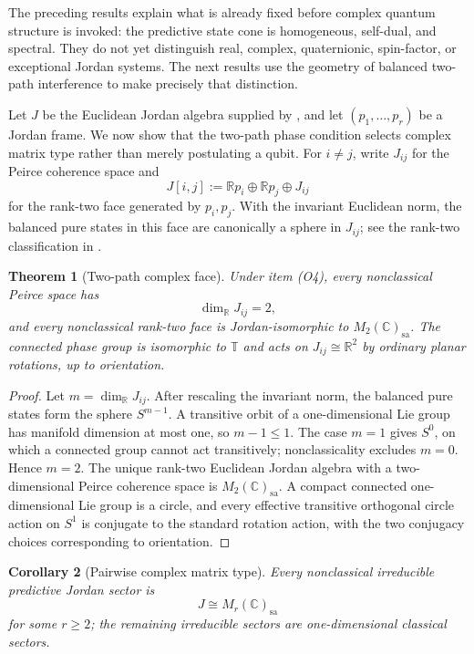 \documentclass[11pt]{article}
\newtheorem{theorem}{Theorem}[section]
\newtheorem{corollary}[theorem]{Corollary}
\theoremstyle{definition}
\theoremstyle{remark}
\newcommand{\R}{\mathbb R}
\newcommand{\C}{\mathbb C}
\newcommand{\T}{\mathbb T}
\begin{document}
The preceding results explain what is already fixed before complex quantum
structure is invoked: the predictive state cone is homogeneous, self-dual, and
spectral.  They do not yet distinguish real, complex, quaternionic, spin-factor,
or exceptional Jordan systems.  The next results use the geometry of balanced
two-path interference to make precisely that distinction.

Let $J$ be the Euclidean Jordan algebra supplied by
, and let $(p_1,\ldots,p_r)$ be a Jordan frame.  We
now show that the two-path phase condition selects complex matrix type rather
than merely postulating a qubit.  For $i\ne j$, write $J_{ij}$ for the
Peirce coherence space and
\[
 J[i,j]:=\R p_i\oplus\R p_j\oplus J_{ij}
\]
for the rank-two face generated by $p_i,p_j$.  With the invariant Euclidean
norm, the balanced pure states in this face are canonically a sphere in
$J_{ij}$; see the rank-two classification in
\cite{JordanVonNeumannWigner1934,BarnumHilgert2020}.

\begin{theorem}[Two-path complex face]
\label{thm:two-path-complex-face}
Under item \textup{(O4)}, every nonclassical Peirce space has
\[
 \dim_{\R}J_{ij}=2,
\]
and every nonclassical rank-two face is Jordan-isomorphic to
$M_2(\C)_{\mathrm{sa}}$.  The connected phase group is isomorphic to $\T$ and
acts on $J_{ij}\cong\R^2$ by ordinary planar rotations, up to orientation.
\end{theorem}

\begin{proof}
Let $m=\dim_{\R}J_{ij}$.  After rescaling the invariant norm, the balanced pure
states form the sphere $S^{m-1}$.  A transitive orbit of a one-dimensional Lie
group has manifold dimension at most one, so $m-1\le1$.  The case $m=1$ gives
$S^0$, on which a connected group cannot act transitively; nonclassicality
excludes $m=0$.  Hence $m=2$.  The unique rank-two Euclidean Jordan algebra with
a two-dimensional Peirce coherence space is $M_2(\C)_{\mathrm{sa}}$.  A compact
connected one-dimensional Lie group is a circle, and every effective transitive
orthogonal circle action on $S^1$ is conjugate to the standard rotation action,
with the two conjugacy choices corresponding to orientation.
\end{proof}

\begin{corollary}[Pairwise complex matrix type]
\label{cor:pairwise-complex-type}
Every nonclassical irreducible predictive Jordan sector is
\[
 J\cong M_r(\C)_{\mathrm{sa}}
\]
for some $r\ge2$; the remaining irreducible sectors are one-dimensional
classical sectors.
\end{corollary}
\end{document}
